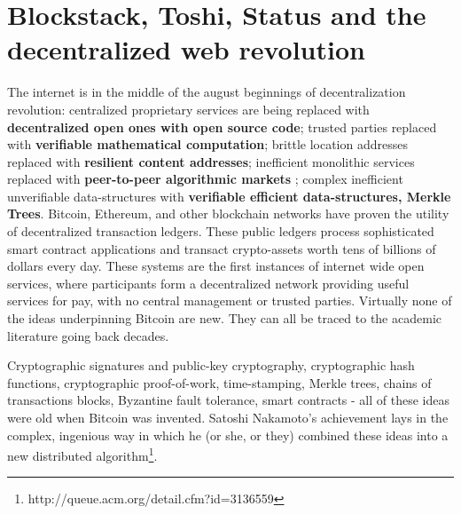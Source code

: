 \documentclass{article}
\begin{document}
\section{Blockstack, Toshi, Status and the decentralized web revolution}
 The internet is in the middle of the august beginnings of decentralization revolution: centralized proprietary services are being replaced with \textbf{decentralized open ones with open source code}; trusted parties replaced with \textbf{verifiable mathematical computation}; brittle location addresses replaced with \textbf{resilient content addresses}; inefficient monolithic services replaced with \textbf{peer-to-peer algorithmic markets} ; complex inefficient unverifiable data-structures with \textbf{verifiable efficient data-structures, Merkle Trees}. Bitcoin, Ethereum, and other blockchain networks have proven the utility of decentralized transaction ledgers. These public ledgers process sophisticated smart contract applications and transact crypto-assets worth tens of billions of dollars every day. These systems are the first instances of internet wide open services, where participants form a decentralized network providing useful services for pay, with no central management or trusted parties.
Virtually none of the ideas underpinning Bitcoin are new. They can all be traced to the academic literature going back decades.

 Cryptographic signatures and public-key cryptography, cryptographic hash functions, cryptographic proof-of-work, time-stamping, Merkle trees, chains of transactions blocks, Byzantine fault tolerance, smart contracts - all of these ideas were old when Bitcoin was invented.
 Satoshi Nakamoto's achievement lays in the complex, ingenious way in which he (or she, or they) combined these ideas into a new distributed algorithm\footnote{http://queue.acm.org/detail.cfm?id=3136559}.
 

 
\end{document}
